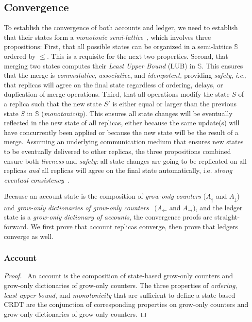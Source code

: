\documentclass[9pt]{article}   	%
\begin{document}
\subsection{Convergence}

To establish the convergence of both accounts and ledger, we need to establish that their states form a \textit{monotonic semi-lattice}~\cite{shapiro:hal-00932836}, which involves three propositions: First, that all possible states can be organized in a semi-lattice $\mathds{S}$ ordered by $\leq$. This is a requisite for the next two properties. Second, that merging two states computes their \textit{Least Upper Bound} (LUB) in $\mathds{S}$. This ensures that the merge is \textit{commutative}, \textit{associative}, and \textit{idempotent}, providing \textit{safety}, \textit{i.e.}, that replicas will agree on the final state regardless of ordering, delays, or duplication of merge operations. Third, that all operations modify the state $S$ of a replica such that the new state $S'$ is either equal or larger than the previous state $S$ in $\mathds{S}$ (\textit{monotonicity}). This ensures all state changes will be eventually reflected in the new state of all replicas, either because the same update(s) will have concurrently been applied or because the new state will be the result of a merge. Assuming an underlying communication medium that ensures new states to be eventually delivered to other replicas, the three propositions combined ensure both \textit{liveness} and \textit{safety}: all state changes are going to be replicated on all replicas \textit{and} all replicas will agree on the final state automatically, i.e. \textit{strong eventual consistency}~\cite{shapiro:hal-00932836}.

Because an account state is the composition of \textit{grow-only counters} ($A_\uparrow$ and $A_\downarrow$) and \textit{grow-only dictionaries of grow-only counters}~\cite{lavoie2023statebased} ($A_\leftarrow$ and $A_\rightarrow$), and the ledger state is a \textit{grow-only dictionary of accounts}, the convergence proofs are straight-forward. We first prove that account replicas converge, then prove that ledgers converge as well.

\subsubsection{Account}
\label{sec:proof:account}

\begin{proof}
	\pfsketch ~An account is the composition of state-based grow-only counters and grow-only dictionaries of grow-only counters. The three properties of \textit{ordering}, \textit{least upper bound}, and \textit{monotonicity} that are sufficient to define a state-based CRDT are the conjunction of corresponding properties on grow-only counters and grow-only dictionaries of grow-only counters.
\end{proof}
\end{document}
